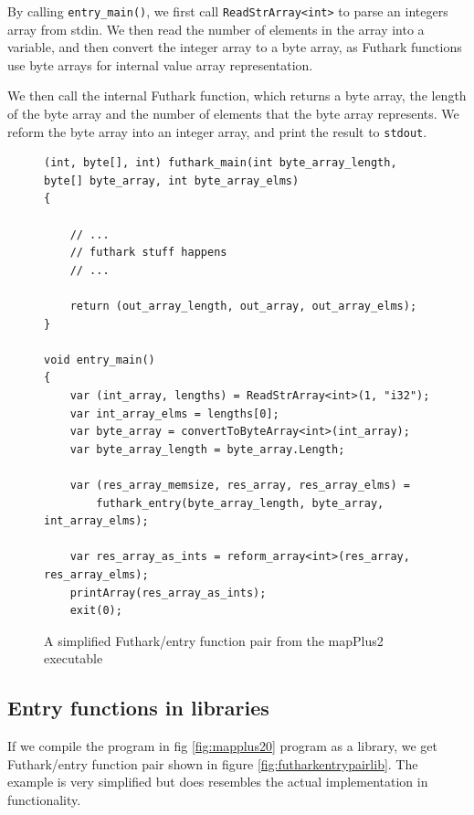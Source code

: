 By calling \texttt{entry\_main()}, we first call \texttt{ReadStrArray<int>} to parse an integers
array from stdin. We then read the number of elements in the array into a
variable, and then convert the integer array to a byte array, as Futhark
functions use byte arrays for internal value array representation.

We then call the internal Futhark function, which returns a byte array, the
length of the byte array and the number of elements that the byte array
represents.
We reform the byte array into an integer array, and print the result to \texttt{stdout}.

\begin{figure}[H]
  \centering
\begin{verbatim}
(int, byte[], int) futhark_main(int byte_array_length, byte[] byte_array, int byte_array_elms)
{

    // ...
    // futhark stuff happens
    // ...

    return (out_array_length, out_array, out_array_elms);
}

void entry_main()
{
    var (int_array, lengths) = ReadStrArray<int>(1, "i32");
    var int_array_elms = lengths[0];
    var byte_array = convertToByteArray<int>(int_array);
    var byte_array_length = byte_array.Length;

    var (res_array_memsize, res_array, res_array_elms) =
        futhark_entry(byte_array_length, byte_array, int_array_elms);

    var res_array_as_ints = reform_array<int>(res_array, res_array_elms);
    printArray(res_array_as_ints);
    exit(0);
\end{verbatim}
  \caption{A simplified Futhark/entry function pair from the mapPlus2 executable}
  \label{fig:futharkentrypairexe}
\end{figure}

\subsection{Entry functions in libraries}
If we compile the program in fig \ref{fig:mapplus20} program as a library, we get Futhark/entry function pair
shown in figure \ref{fig:futharkentrypairlib}. The example is very simplified
but does resembles the actual implementation in functionality.

